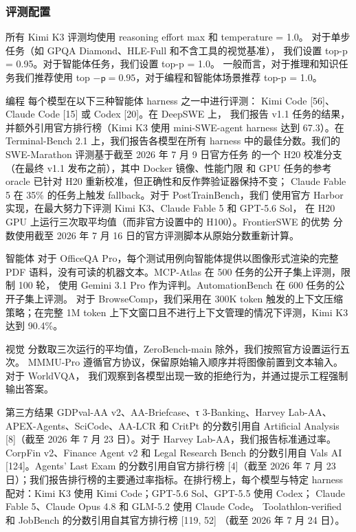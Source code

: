 \subsubsection{评测配置}\label{evaluation-configurations}

所有 Kimi K3 评测均使用 reasoning effort max 和 temperature = 1.0。
对于单步任务（如 GPQA Diamond、HLE-Full 和不含工具的视觉基准），
我们设置 top-p = 0.95。对于智能体任务，我们设置 top-p = 1.0。
一般而言，对于推理和知识任务我们推荐使用 top
\(- \mathsf { p } = 0 . 9 5\)，对于编程和智能体场景推荐 top-p = 1.0。

编程 每个模型在以下三种智能体 harness 之一中进行评测：
Kimi Code {[}56{]}、Claude Code {[}15{]} 或 Codex {[}20{]}。在 DeepSWE 上，
我们报告 v1.1 任务的结果，并额外引用官方排行榜（Kimi K3 使用 mini-SWE-agent
harness 达到 67.3）。在 Terminal-Bench 2.1 上，我们报告各模型在所有 harness
中的最佳分数。我们的 SWE-Marathon 评测基于截至 2026 年 7 月 9 日官方任务
的一个 H20 校准分支（在最终 v1.1 发布之前），其中 Docker 镜像、性能门限
和 GPU 任务的参考 oracle 已针对 H20 重新校准，但正确性和反作弊验证器保持不变；
Claude Fable 5 在 35\% 的任务上触发 fallback。对于 PostTrainBench，我们
使用官方 Harbor 实现，在最大努力下评测 Kimi K3、Claude Fable 5 和 GPT-5.6 Sol，
在 H20 GPU 上运行三次取平均值（而非官方设置中的 H100）。FrontierSWE 的优势
分数使用截至 2026 年 7 月 16 日的官方评测脚本从原始分数重新计算。

智能体 对于 OfficeQA Pro，每个测试用例向智能体提供以图像形式渲染的完整 PDF
语料，没有可读的机器文本。MCP-Atlas 在 500 任务的公开子集上评测，限制 100 轮，
使用 Gemini 3.1 Pro 作为评判。AutomationBench 在 600 任务的公开子集上评测。
对于 BrowseComp，我们采用在 300K token 触发的上下文压缩策略；在完整 1M token
上下文窗口且不进行上下文管理的情况下评测，Kimi K3 达到 90.4\%。

视觉 分数取三次运行的平均值，ZeroBench-main 除外，我们按照官方设置运行五次。
MMMU-Pro 遵循官方协议，保留原始输入顺序并将图像前置到文本输入。对于 WorldVQA，
我们观察到各模型出现一致的拒绝行为，并通过提示工程强制输出答案。

第三方结果 GDPval-AA v2、AA-Briefcase、τ 3-Banking、Harvey Lab-AA、
APEX-Agents、SciCode、AA-LCR 和 CritPt 的分数引用自 Artificial Analysis
{[}8{]}（截至 2026 年 7 月 23 日）。对于 Harvey Lab-AA，我们报告标准通过率。
CorpFin v2、Finance Agent v2 和 Legal Research Bench 的分数引用自 Vals AI
{[}124{]}。Agents' Last Exam 的分数引用自官方排行榜 {[}4{]}（截至 2026 年
7 月 23 日）；我们报告排行榜的主要通过率指标。在排行榜上，每个模型与特定
harness 配对：Kimi K3 使用 Kimi Code；GPT-5.6 Sol、GPT-5.5 使用 Codex；
Claude Fable 5、Claude Opus 4.8 和 GLM-5.2 使用 Claude Code。
Toolathlon-verified 和 JobBench 的分数引用自其官方排行榜 {[}119, 52{]}
（截至 2026 年 7 月 24 日）。

